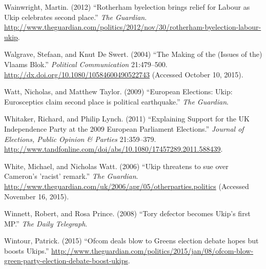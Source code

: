 \documentclass[12pt,article]{article}
\begin{document}
Wainwright, Martin. (2012) ``Rotherham byelection brings relief for
Labour as Ukip celebrates second place.'' \emph{The Guardian}.
\url{http://www.theguardian.com/politics/2012/nov/30/rotherham-byelection-labour-ukip}.

Walgrave, Stefaan, and Knut De Swert. (2004) ``The Making of the (Issues
of the) Vlaams Blok.'' \emph{Political Communication} 21:479--500.
\url{http://dx.doi.org/10.1080/10584600490522743} (Accessed October 10,
2015).

Watt, Nicholas, and Matthew Taylor. (2009) ``European Elections: Ukip:
Eurosceptics claim second place is political earthquake.'' \emph{The
Guardian}.

Whitaker, Richard, and Philip Lynch. (2011) ``Explaining Support for the
UK Independence Party at the 2009 European Parliament Elections.''
\emph{Journal of Elections, Public Opinion \& Parties} 21:359--379.
\url{http://www.tandfonline.com/doi/abs/10.1080/17457289.2011.588439}.

White, Michael, and Nicholas Watt. (2006) ``Ukip threatens to sue over
Cameron's 'racist' remark.'' \emph{The Guardian}.
\url{http://www.theguardian.com/uk/2006/apr/05/otherparties.politics}
(Accessed November 16, 2015).

Winnett, Robert, and Rosa Prince. (2008) ``Tory defector becomes Ukip's
first MP.'' \emph{The Daily Telegraph}.

Wintour, Patrick. (2015) ``Ofcom deals blow to Greens election debate
hopes but boosts Ukips.''
\url{http://www.theguardian.com/politics/2015/jan/08/ofcom-blow-green-party-election-debate-boost-ukips}.
\end{document}
